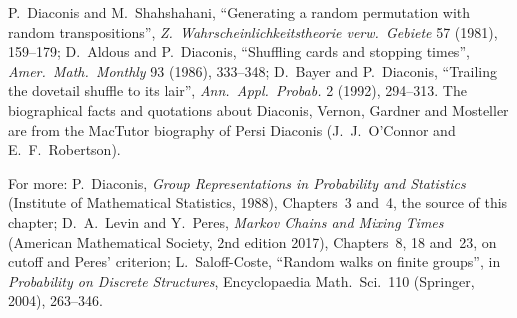 P.~Diaconis and M.~Shahshahani, ``Generating a random permutation with random transpositions'', \emph{Z.\ Wahrscheinlichkeitstheorie verw.\ Gebiete} 57 (1981), 159--179; D.~Aldous and P.~Diaconis, ``Shuffling cards and stopping times'', \emph{Amer.\ Math.\ Monthly} 93 (1986), 333--348;
D.~Bayer and P.~Diaconis, ``Trailing the dovetail shuffle to its lair'', \emph{Ann.\ Appl.\ Probab.} 2 (1992), 294--313. The biographical facts and quotations about Diaconis, Vernon, Gardner and Mosteller are from the MacTutor biography of Persi Diaconis (J.~J.~O'Connor and E.~F.~Robertson).

For more: P.~Diaconis, \emph{Group Representations in Probability and Statistics} (Institute of Mathematical Statistics, 1988), Chapters~3 and~4, the source of this chapter; D.~A.~Levin and Y.~Peres, \emph{Markov Chains and Mixing Times} (American Mathematical Society, 2nd edition 2017), Chapters~8, 18 and~23, on
cutoff and Peres' criterion; L.~Saloff-Coste, ``Random walks on finite groups'', in \emph{Probability on Discrete Structures}, Encyclopaedia Math.\ Sci.\ 110 (Springer, 2004), 263--346.
